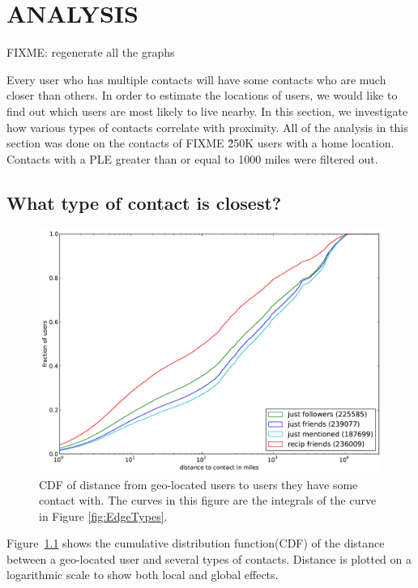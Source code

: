 
\chapter{\uppercase{Analysis}}

FIXME: regenerate all the graphs

Every user who has multiple contacts will have some contacts who are much
closer than others. In order to estimate the locations of users, we would like
to find out which users are most likely to live nearby.  In this section, we
investigate how various types of contacts correlate with proximity.
All of the analysis in this section was done on the contacts of FIXME \~250K users
with a home location.
Contacts with a PLE greater than or equal to 1000 miles were filtered out.

\section{What type of contact is closest?}

\begin{figure}[h]
\centering
\includegraphics[width=\linewidth]{figures/edge_types_cuml.pdf}
\caption{
CDF of distance from geo-located users to users they have some contact
with.
The curves in this figure are the integrals of the curve in Figure \ref{fig:EdgeTypes}.
}
\label{fig:EdgeTypesCum}
\end{figure}

Figure~\ref{fig:EdgeTypesCum} shows the cumulative distribution
function(CDF) of the distance between a geo-located user and several types of
contacts.
Distance is plotted on a logarithmic scale to show both local and
global effects.

